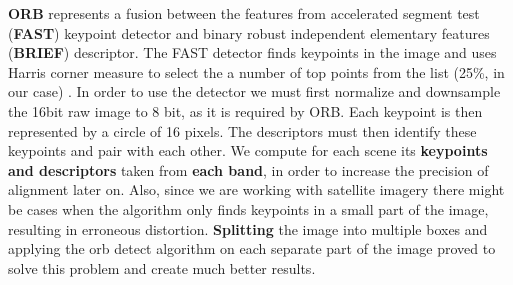\documentclass[11pt, a4paper]{report}
\begin{document}
	\textbf{ORB} represents a fusion between the features from accelerated segment test (\textbf{FAST}) keypoint detector and binary robust independent elementary features (\textbf{BRIEF}) descriptor. The FAST detector finds keypoints in the image and uses Harris corner measure to select the a number of top points from the list (25\%, in our case) \cite{orb}. In order to use the detector we must first normalize and downsample the 16bit raw image to 8 bit, as it is required by ORB. Each keypoint is then represented by a circle of 16 pixels. The descriptors must then identify these keypoints and pair with each other.
	We compute for each scene its \textbf{keypoints and descriptors} taken from \textbf{each band}, in order to increase the precision of alignment later on. Also, since we are working with satellite imagery there might be cases when the algorithm only finds keypoints in a small part of the image, resulting in erroneous distortion. \textbf{Splitting} the image into multiple boxes and applying the orb detect algorithm on each separate part of the image proved to solve this problem and create much better results. 
	
\end{document}

